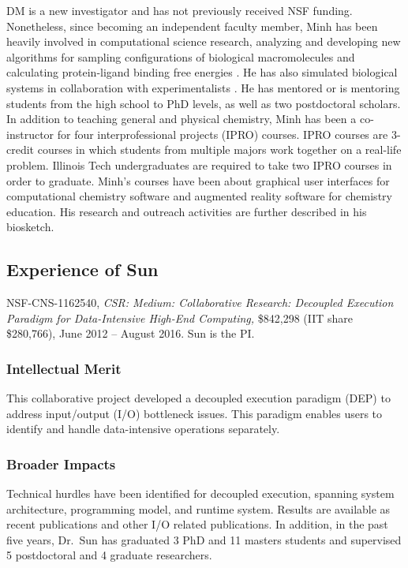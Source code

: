 \documentclass[11pt]{NSFamsart}
\begin{document}
DM is a new investigator and has not previously received NSF funding. Nonetheless, since becoming an independent faculty member, Minh has been heavily involved in computational science research, analyzing \cite{Nguyen2016} and developing new algorithms for sampling configurations of biological macromolecules \cite{Spiridon2017} and calculating protein-ligand binding free energies \cite{Minh2015, Nguyen2017, Xie2017a}. He has also simulated biological systems in collaboration with experimentalists \cite{Tuz2017}. He has mentored or is mentoring students from the high school to PhD levels, as well as two postdoctoral scholars. In addition to teaching general and physical chemistry, Minh has been a co-instructor for four interprofessional projects (IPRO) courses. IPRO courses are 3-credit courses in which students from multiple majors work together on a real-life problem. Illinois Tech undergraduates are required to take two IPRO courses in order to graduate. Minh's courses have been about graphical user interfaces for computational chemistry software and augmented reality software for chemistry education. His research and outreach activities are further described in his biosketch.

\subsection{Experience of Sun}  NSF-CNS-1162540, \emph{CSR: Medium: Collaborative Research: Decoupled Execution Paradigm for Data-Intensive High-End Computing,} \$842,298 (IIT share \$280,766), June 2012 -- August 2016. Sun is the PI.  
\subsubsection{Intellectual Merit} This collaborative project developed a decoupled execution paradigm (DEP) to address input/output (I/O) bottleneck issues. This paradigm enables users to identify and handle data-intensive operations separately. 

\subsubsection{Broader Impacts} Technical hurdles have been identified for decoupled execution, spanning system architecture, programming model, and runtime system. Results are available as recent publications \cite{HeWS16, HeWS16a, HWSX17, HWLS17, HWSH17, KYES16, SuWa14, WaSu14, ZLKR16} and other I/O related publications. In addition, in the past five years, Dr.~Sun has graduated 3 PhD and 11 masters students and supervised 5 postdoctoral and 4 graduate researchers.
\end{document}
